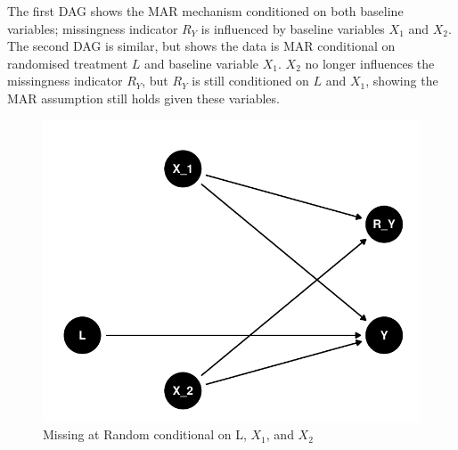 \documentclass{article}
\begin{document}
The first DAG shows the MAR mechanism conditioned on both baseline
variables; missingness indicator \(R_Y\) is influenced by baseline
variables \(X_1\) and \(X_2\). The second DAG is similar, but shows the
data is MAR conditional on randomised treatment \(L\) and baseline
variable \(X_1\). \(X_2\) no longer influences the missingness indicator
\(R_Y\), but \(R_Y\) is still conditioned on \(L\) and \(X_1\), showing
the MAR assumption still holds given these variables.

\begin{figure}

{\centering \includegraphics{Final_Report_files/figure-latex/unnamed-chunk-2-1} 

}

\caption{Missing at Random conditional on L, \ensuremath{X_1}, and \ensuremath{X_2}}\label{fig:unnamed-chunk-2}
\end{figure}
\end{document}
